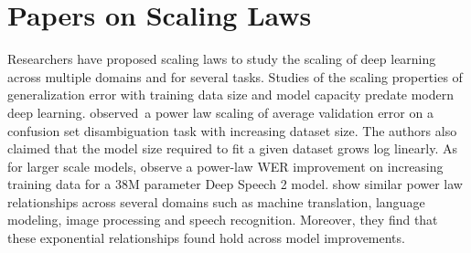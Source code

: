
\section{Papers on Scaling Laws}\label{sec:related-work}


Researchers have proposed scaling laws to study the scaling of deep learning across multiple domains and for several tasks. Studies of the scaling properties of generalization error with training data size and model capacity predate modern deep learning. \citet{banko2001scaling} observed\ a power law scaling of average validation error on a confusion set disambiguation task with increasing dataset size. The authors also claimed that the model size required to fit a given dataset grows log linearly. As for larger scale models, \cite{amodei2016deep} observe a power-law WER improvement on increasing training data for a 38M parameter Deep Speech 2 model. \cite{hestness2017deep} show similar power law relationships across several domains such as machine translation, language modeling, image processing and speech recognition. Moreover, they find that these exponential relationships found hold across model improvements. 

